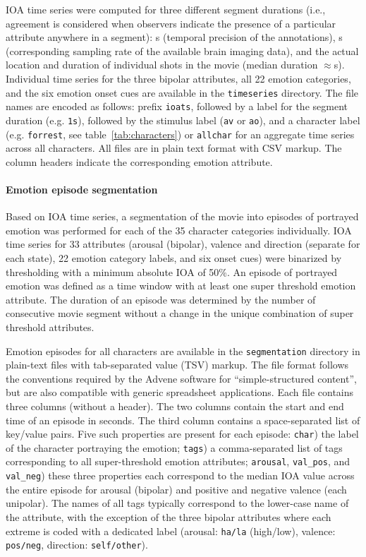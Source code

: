 \documentclass[10pt,a4paper,twocolumn]{article}
\begin{document}
IOA time series were computed for three different segment durations (i.e.,
agreement is considered when observers indicate the presence of a particular
attribute anywhere in a segment): \unit[1]{s} (temporal precision of the
annotations), \unit[2]{s} (corresponding sampling rate of the available brain
imaging data), and the actual location and duration of individual shots in the
movie (median duration $\approx$\unit[5]{s}). Individual time series for the
three bipolar attributes, all 22 emotion categories, and the six emotion onset
cues are available in the \texttt{timeseries} directory. The file names are
encoded as follows: prefix \texttt{ioats}, followed by a label for the segment
duration (e.g. \texttt{1s}), followed by the stimulus label (\texttt{av} or
\texttt{ao}), and a character label (e.g. \texttt{forrest}, see
table~\ref{tab:characters}) or \texttt{allchar} for an aggregate time series
across all characters. All files are in plain text format with CSV markup. The
column headers indicate the corresponding emotion attribute.

\paragraph{Emotion episode segmentation}

Based on IOA time series, a segmentation of the movie into episodes of portrayed
emotion was performed for each of the 35 character categories individually. IOA
time series for 33 attributes (arousal (bipolar), valence and direction
(separate for each state), 22 emotion category labels, and six onset cues) were
binarized by thresholding with a minimum absolute IOA of 50\%. An episode of
portrayed emotion was defined as a time window with at least one super
threshold emotion attribute. The duration of an episode was determined by the
number of consecutive movie segment without a change in the unique combination
of super threshold attributes.

Emotion episodes for all characters are available in the \texttt{segmentation}
directory in plain-text files with tab-separated value (TSV) markup. The file
format follows the conventions required by the Advene software for
``simple-structured content'', but are also compatible with generic spreadsheet
applications. Each file contains three columns (without a header). The two
columns contain the start and end time of an episode in seconds. The third
column contains a space-separated list of key/value pairs. Five such properties
are present for each episode: \texttt{char}) the label of the character
portraying the emotion; \texttt{tags}) a comma-separated list of tags
corresponding to all super-threshold emotion attributes; \texttt{arousal},
\texttt{val\_pos}, and \texttt{val\_neg}) these three properties each
correspond to the median IOA value across the entire episode for arousal
(bipolar) and positive and negative valence (each unipolar). The names of all
tags typically correspond to the lower-case name of the attribute, with the
exception of the three bipolar attributes where each extreme is coded with a
dedicated label (arousal: \texttt{ha/la} (high/low), valence: \texttt{pos/neg},
direction: \texttt{self/other}).
\end{document}
